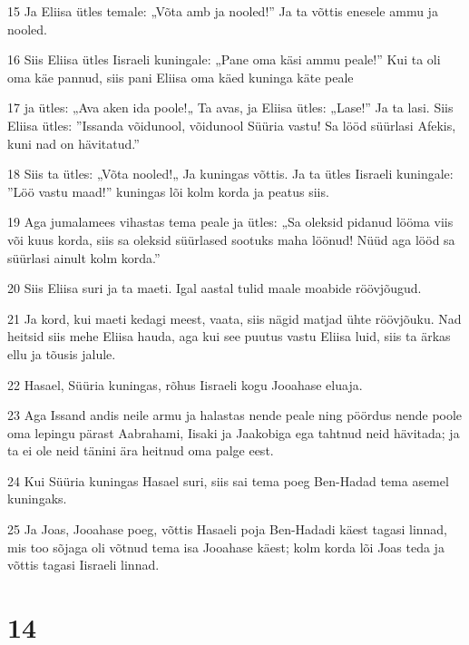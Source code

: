 \par 15 Ja Eliisa ütles temale: „Võta amb ja nooled!” Ja ta võttis enesele ammu ja nooled.
\par 16 Siis Eliisa ütles Iisraeli kuningale: „Pane oma käsi ammu peale!” Kui ta oli oma käe pannud, siis pani Eliisa oma käed kuninga käte peale
\par 17 ja ütles: „Ava aken ida poole!„ Ta avas, ja Eliisa ütles: „Lase!” Ja ta lasi. Siis Eliisa ütles: ”Issanda võidunool, võidunool Süüria vastu! Sa lööd süürlasi Afekis, kuni nad on hävitatud.”
\par 18 Siis ta ütles: „Võta nooled!„ Ja kuningas võttis. Ja ta ütles Iisraeli kuningale: ”Löö vastu maad!” kuningas lõi kolm korda ja peatus siis.
\par 19 Aga jumalamees vihastas tema peale ja ütles: „Sa oleksid pidanud lööma viis või kuus korda, siis sa oleksid süürlased sootuks maha löönud! Nüüd aga lööd sa süürlasi ainult kolm korda.”
\par 20 Siis Eliisa suri ja ta maeti. Igal aastal tulid maale moabide röövjõugud.
\par 21 Ja kord, kui maeti kedagi meest, vaata, siis nägid matjad ühte röövjõuku. Nad heitsid siis mehe Eliisa hauda, aga kui see puutus vastu Eliisa luid, siis ta ärkas ellu ja tõusis jalule.
\par 22 Hasael, Süüria kuningas, rõhus Iisraeli kogu Jooahase eluaja.
\par 23 Aga Issand andis neile armu ja halastas nende peale ning pöördus nende poole oma lepingu pärast Aabrahami, Iisaki ja Jaakobiga ega tahtnud neid hävitada; ja ta ei ole neid tänini ära heitnud oma palge eest.
\par 24 Kui Süüria kuningas Hasael suri, siis sai tema poeg Ben-Hadad tema asemel kuningaks.
\par 25 Ja Joas, Jooahase poeg, võttis Hasaeli poja Ben-Hadadi käest tagasi linnad, mis too sõjaga oli võtnud tema isa Jooahase käest; kolm korda lõi Joas teda ja võttis tagasi Iisraeli linnad.

\chapter{14}


